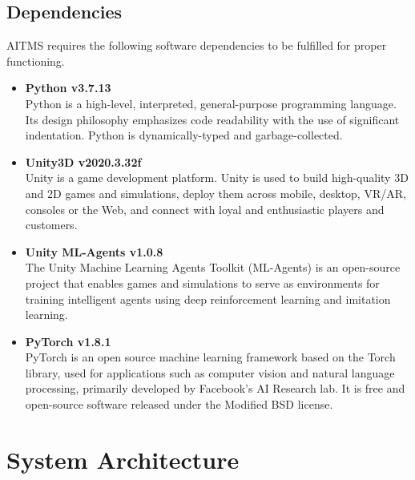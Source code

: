 \documentclass[openany,12pt]{report}
\begin{document}
	\subsection{Dependencies}
	\hspace*{0.5in}AITMS requires the following software dependencies to be fulfilled for proper functioning.
	\begin{itemize}
		\item{\textbf{Python v3.7.13}\\
			Python is a high-level, interpreted, general-purpose programming language. Its design philosophy emphasizes code readability with the use of significant indentation. Python is dynamically-typed and garbage-collected. }
		\item{\textbf{Unity3D v2020.3.32f}\\
			Unity is a game development platform. Unity is used to build high-quality 3D and 2D games and simulations, deploy them across mobile, desktop, VR/AR, consoles or the Web, and connect with loyal and enthusiastic players and customers.}\\
		\item{\textbf{Unity ML-Agents v1.0.8}\\
			The Unity Machine Learning Agents Toolkit (ML-Agents) is an open-source project that enables games and simulations to serve as environments for training intelligent agents using deep reinforcement learning and imitation learning.}
		\item{\textbf{PyTorch v1.8.1}\\
			PyTorch is an open source machine learning framework based on the Torch library, used for applications such as computer vision and natural language processing, primarily developed by Facebook's AI Research lab. It is free and open-source software released under the Modified BSD license.}
		
	\end{itemize}
	
	
	\newpage
	\section{System Architecture}
	
\end{document}

